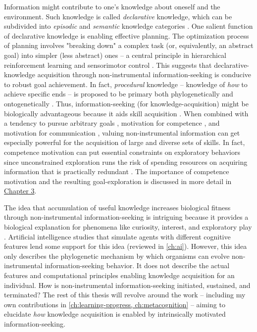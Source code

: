 Information might contribute to one's knowledge about oneself and the environment. Such knowledge is called \emph{declarative} knowledge, which can be subdivided into \emph{episodic} and \emph{semantic} knowledge categories \parencite{tulving_episodic_1972}. One salient function of declarative knowledge is enabling effective planning. The optimization process of planning involves "breaking down" a complex task (or, equivalently, an abstract goal) into simpler (less abstract) ones -- a central principle in hierarchical reinforcement learning \parencite{pateria_hierarchical_2021} and sensorimotor control \parencite{todorov_optimal_2002}. This suggests that declarative-knowledge acquisition through non-instrumental information-seeking is conducive to robust goal achievement. In fact, \emph{procedural} knowledge -- knowledge of \emph{how} to achieve specific ends -- is proposed to be primary both phylogenetically and ontogenetically \parencite{ten_berge_procedural_1999}. Thus, information-seeking (for knowledge-acquisition) might be biologically advantageous because it aids skill acquisition \parencite{gottlieb_information-seeking_2013}. When combined with a tendency to pursue arbitrary goals \parencite{chu_play_2020}, motivation for competence \parencite{deci_concept_2005}, and motivation for communication \parencite{boyd_evolution_2018}, valuing non-instrumental information can get especially powerful for the acquisition of large and diverse sets of skills. In fact, competence motivation can put essential constraints on exploratory behaviors since unconstrained exploration runs the risk of spending resources on acquiring information that is practically redundant \parencite{baldassarre_intrinsically_2013}. The importance of competence motivation and the resulting goal-exploration is discussed in more detail in \hyperref[ch:ai]{Chapter 3}.

The idea that accumulation of useful knowledge increases biological fitness through  non-instrumental information-seeking is intriguing because it provides a biological explanation for phenomena like curiosity, interest, and exploratory play \parencite{gottlieb_towards_2018,murayama_process_2019,chu_exploratory_2020}. Artificial intelligence studies that simulate agents with different cognitive features lend some support for this idea (reviewed in \autoref{ch:ai}). However, this idea only describes the phylogenetic mechanism by which organisms can evolve non-instrumental information-seeking behavior. It does not describe the actual features and computational principles enabling knowledge acquisition for an individual. How is non-instrumental information-seeking initiated, sustained, and terminated? The rest of this thesis will revolve around the work -- including my own contributions in \autoref{ch:learning-progress, ch:metacognition} -- aiming to elucidate \emph{how} knowledge acquisition is enabled by intrinsically motivated information-seeking.

